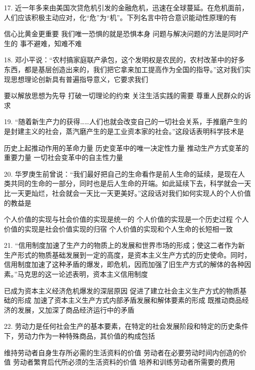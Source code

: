 17. 近一年多来由美国次贷危机引发的金融危机，迅速在全球蔓延。在危机面前，人们应该积极主动应对，化“危”为“机”。下列名言中符合意识能动性原理的有
\begin{choices}
	 信心比黄金更重要
	 我们唯一恐惧的就是恐惧本身
	 问题与解决问题的方法是同时产生的
	 事不避难，知难不难
\end{choices}
18. 邓小平说：“农村搞家庭联产承包，这个发明权是农民的，农村改革中的好多东西，都是基层创造出来的，我们把它拿来加工提高作为全国的指导。”这对我们实现思想理论创新具有普遍指导意义，它要求我们
\begin{choices}
	 要以解放思想为先导
	 打破一切理论的约束
	 关注生活实践的需要
	 尊重人民群众的诉求
\end{choices}
19. “随着新生产力的获得……人们也就会改变自己的一切社会关系，手推磨产生的是封建主义的社会，蒸汽磨产生的是工业资本家的社会。”这段话表明科学技术是
\begin{choices}
	 历史上起推动作用的革命力量
	 历史变革中的唯一决定性力量
	 推动生产方式变革的重要力量
	 一切社会变革中的自主性力量
\end{choices}
20. 华罗庚生前曾说：“我们最好把自己的生命看作是前人生命的延续，是现在人类共同的生命的一部分，同时也是后人生命的开端。如此延续下去，科学就会一天比一天更灿烂，社会就会一天比一天更美好。”这段话对我们如何实现人的个人价值的教益是
\begin{choices}
	 个人价值的实现与社会价值的实现是统一的
	 个人价值的实现是一个历史过程
	 个人价值的实现是社会价值实现的归宿
	 个人价值的实现和个人生命的长短相一致
\end{choices}
21. “信用制度加速了生产力的物质上的发展和世界市场的形成；使这二者作为新生产形式的物质基础发展到一定的高度，是资本主义生产方式的历史使命。同时，信用制度加速了这种矛盾的爆发，即危机，因而加强了旧生产方式的解体的各种因素。”马克思的这一论述表明，资本主义信用制度
\begin{choices}
	 已成为资本主义经济危机爆发的深层原因
	 促进了建立社会主义生产方式的物质基础的形成
	 加速了资本主义生产方式内部矛盾发展和解体要素的形成
	 既推动商品经济的发展，又加深了商品经济运行中的矛盾
\end{choices}
22. 劳动力是任何社会生产的基本要素，在特定的社会发展阶段和特定的历史条件下，劳动力作为一种特殊商品，其价值的构成包括
\begin{choices}
	 维持劳动者自身生存所必需的生活资料的价值
	 劳动者在必要劳动时间内创造的价值
	 劳动者繁育后代所必须的生活资料的价值
	 培养和训练劳动者所需要的费用
\end{choices}
